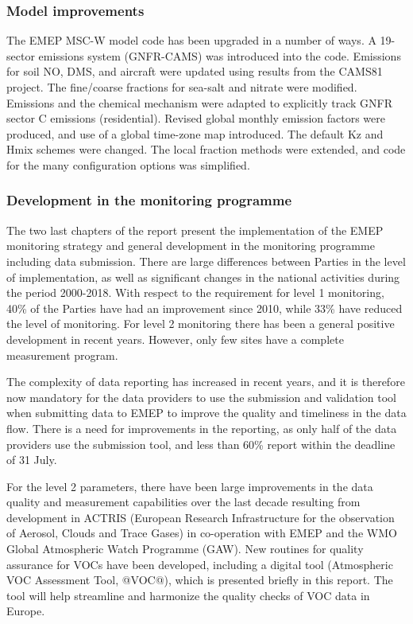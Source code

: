 

\subsubsection*{Model improvements} %

The EMEP MSC-W model code has been upgraded in a number of ways. 
A 19-sector emissions system (GNFR-CAMS) was introduced into the code. Emissions for soil NO, DMS, and aircraft were updated using results from the CAMS81 project. 
The  fine/coarse fractions for sea-salt and nitrate were modified. Emissions and the chemical mechanism were adapted to explicitly track GNFR sector C emissions (residential). Revised global monthly emission factors were produced, and use of a global time-zone map introduced. The default Kz  and Hmix schemes were changed. The local fraction methods were extended, and code for the many configuration options was simplified. 




\subsubsection*{Development in the monitoring programme} %
The two last chapters of the report present the implementation of the EMEP monitoring strategy and general development in the monitoring programme including data submission. There are large differences between Parties in the level of implementation, as well as significant changes in the national activities during the period 2000-2018. With respect to the requirement for level 1 monitoring, 40\% of the Parties have had an improvement since 2010, while 33\% have reduced the level of monitoring. For level 2 monitoring there has been a general positive development in recent years. However, only few sites have a complete measurement program.

The complexity of data reporting has increased in recent years, and it is therefore now mandatory for the data providers to use the submission and validation tool when submitting data to EMEP to improve the quality and timeliness in the data flow. 
There is a need for improvements in the reporting, as only half of the data 
providers use the submission tool, and less than 60\% report within the deadline of 31 July.

For the level 2 parameters, there have been large improvements in the data quality and measurement capabilities over the last decade resulting from development in ACTRIS (European Research Infrastructure for the observation of Aerosol, Clouds and Trace Gases) in co-operation with EMEP and the WMO Global Atmospheric Watch Programme (GAW). New routines for quality assurance for VOCs have been developed, including a digital tool (Atmospheric VOC Assessment Tool, @VOC@), which is presented briefly in this report. The tool will help streamline and harmonize the quality checks of VOC data in Europe.


